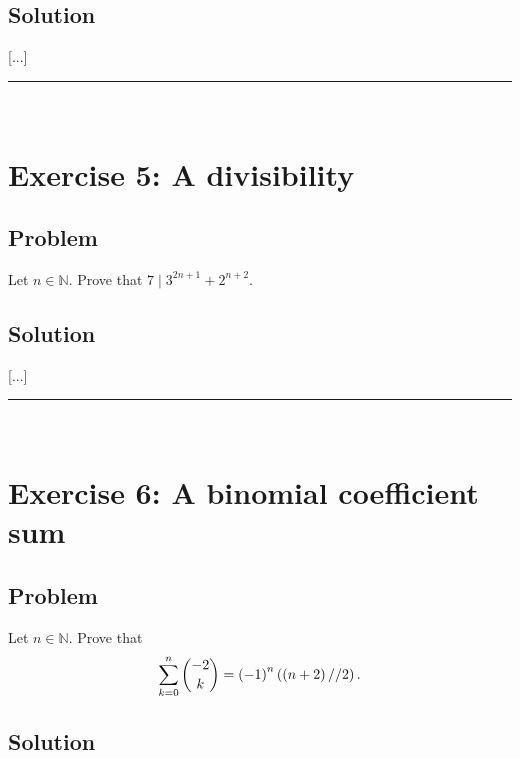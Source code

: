 \documentclass[paper=a4, fontsize=12pt]{scrartcl} %
\newcommand{\NN}{\mathbb{N}} %
\newcommand{\tup}[1]{\left( #1 \right)}
\newcommand{\horrule}[1]{\rule{\linewidth}{#1}} %
\let\sumnonlimits\sum
\renewcommand{\sum}{\sumnonlimits\limits}
\theoremstyle{plainsl}
\theoremstyle{definition}
\theoremstyle{remark}
\begin{document}

\subsection{Solution}

[...]

\horrule{0.3pt} \\[0.4cm]

\section{Exercise 5: A divisibility}

\subsection{Problem}

Let $n \in \NN$.
Prove that $7 \mid 3^{2n+1} + 2^{n+2}$.

\subsection{Solution}

[...]

\horrule{0.3pt} \\[0.4cm]

\section{Exercise 6: A binomial coefficient sum}

\subsection{Problem}

Let $n \in \NN$. Prove that
\begin{align}
\sum_{k=0}^n \dbinom{-2}{k}
= \tup{-1}^n \tup{\tup{n+2} // 2} .
\end{align}

\subsection{Solution}
\end{document}
